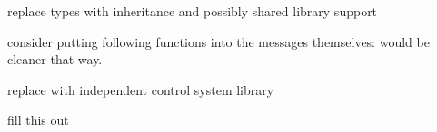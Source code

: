 \begin{DoxyRefList}
replace types with inheritance and possibly shared library support  
\item[\label{todo__todo000001}%
\hypertarget{todo__todo000001}{}%
\-Member \hyperlink{classNeb_1_1app_acefbc3bb3de71f3c8cca0afc1fada857}{\-Neb\-:\-:app\-:\-:recv\-\_\-scene\-\_\-create} (std\-::shared\-\_\-ptr$<$ gal\-::network\-::message $>$)]consider putting following functions into the messages themselves\-: would be cleaner that way.  
\item[\label{todo__todo000002}%
\hypertarget{todo__todo000002}{}%
\-Member \hyperlink{classneb_1_1control_1_1rigid__body_1_1control_a6fad3693d3a31440201a928bc04e71d4}{neb\-:\-:control\-:\-:rigid\-\_\-body\-:\-:control\-:\-:step\-\_\-local1} (double)]replace with independent control system library  
\item[\label{todo__todo000014}%
\hypertarget{todo__todo000014}{}%
\-Member \hyperlink{classNeb_1_1Shape_1_1desc_a8356295ceee1f17dd24afbdb455dd206}{\-Neb\-:\-:\-Shape\-:\-:desc\-:\-:operator$<$$<$} (\-Neb\-::\-Shape\-::shape\-\_\-w const \&)]fill this out 
\end{DoxyRefList}